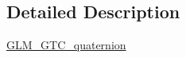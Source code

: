 \subsection{Detailed Description}
\hyperlink{group__gtc__quaternion}{G\+L\+M\+\_\+\+G\+T\+C\+\_\+quaternion} 